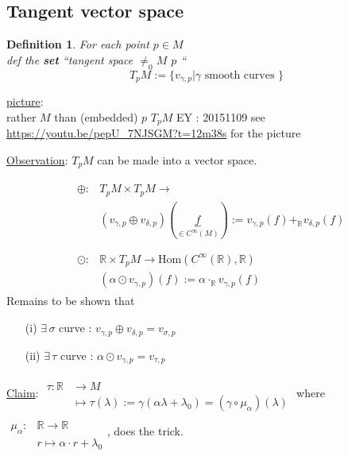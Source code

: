 \documentclass[10pt]{amsart}
\newtheorem{definition}{Definition}
\begin{document}
\begin{multicols*}{2}
	\subsection{Tangent vector space}
	
	\begin{definition}
		For each point $p \in M$ \\
		def the \textbf{set} ``tangent space $\neq_0 M$ \@ $p$ ``
		\[
		T_p M := \lbrace v_{\gamma, p} | \gamma \text{ smooth curves } \rbrace
		\]
	\end{definition}
	
	\underline{picture}:\\
	rather $M$ than (embedded) $p$ $T_pM$ EY : 20151109 see \url{https://youtu.be/pepU_7NJSGM?t=12m38s} for the picture
	
	\underline{Observation}: $T_pM$ can be made into a vector space. 
	
	\[
	\begin{aligned}
	& \begin{aligned}
	\oplus : & T_pM \times T_pM \to   \\
	& (v_{\gamma,p} \oplus v_{\delta,p})(\underbrace{f}_{ \in C^{\infty}(M)} ) := v_{\gamma,p}(f) +_{\mathbb{R}} v_{\delta,p}(f) \\
	\end{aligned} \\
	& \begin{aligned}
	\odot : & \mathbb{R} \times T_pM \to \text{Hom}(C^{\infty}(\mathbb{R}),\mathbb{R}) \\
	& (\alpha \odot v_{\gamma,p} )(f) := \alpha \cdot_{\mathbb{R}}  v_{\gamma, p}(f)
	\end{aligned}
	\end{aligned}
	\]
	Remains to be shown that 
	\begin{enumerate}
		\item[(i)] $\exists \, \sigma$ curve : $v_{\gamma,p} \oplus v_{\delta,p} = v_{\sigma,p}$
		\item[(ii)] $\exists \, \tau $ curve : $\alpha \odot v_{\gamma,p} = v_{\tau,p}$
	\end{enumerate}
	
	\underline{Claim}: $\begin{aligned} & \quad \\ 
	\tau : \mathbb{R}&  \to M  \\
	& \mapsto \tau(\lambda) := \gamma(\alpha  \lambda + \lambda_0) = (\gamma \circ \mu_{\alpha})(\lambda)
	\end{aligned}$
	where $\begin{aligned} & \quad \\
	\mu_{\alpha}: & \mathbb{R} \to \mathbb{R} \\ 
	& r \mapsto \alpha \cdot r + \lambda_0 \end{aligned}$, 
	does the trick.
	

\end{multicols*}
\end{document}
